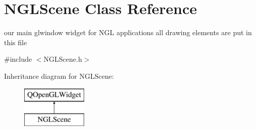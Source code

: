\hypertarget{class_n_g_l_scene}{}\section{N\+G\+L\+Scene Class Reference}
\label{class_n_g_l_scene}


our main glwindow widget for N\+GL applications all drawing elements are put in this file  




{\ttfamily \#include $<$N\+G\+L\+Scene.\+h$>$}

Inheritance diagram for N\+G\+L\+Scene\+:\begin{figure}[H]
\begin{center}
\leavevmode
\includegraphics[height=2.000000cm]{class_n_g_l_scene}
\end{center}
\end{figure}
